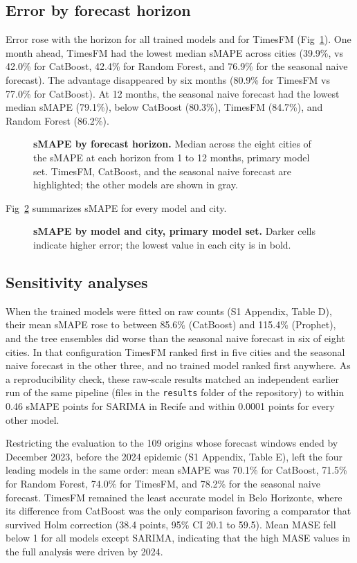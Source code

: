 \documentclass[10pt,letterpaper]{article}
\begin{document}
\subsection*{Error by forecast horizon}
Error rose with the horizon for all trained models and for TimesFM (Fig~\ref{fig3}). One month ahead, TimesFM had the lowest median sMAPE across cities (39.9\%, vs 42.0\% for CatBoost, 42.4\% for Random Forest, and 76.9\% for the seasonal naive forecast). The advantage disappeared by six months (80.9\% for TimesFM vs 77.0\% for CatBoost). At 12 months, the seasonal naive forecast had the lowest median sMAPE (79.1\%), below CatBoost (80.3\%), TimesFM (84.7\%), and Random Forest (86.2\%).

\begin{figure}[!h]
\caption{\textbf{sMAPE by forecast horizon.}
Median across the eight cities of the sMAPE at each horizon from 1 to 12 months, primary model set. TimesFM, CatBoost, and the seasonal naive forecast are highlighted; the other models are shown in gray.}
\label{fig3}
\end{figure}

Fig~\ref{fig4} summarizes sMAPE for every model and city.

\begin{figure}[!h]
\caption{\textbf{sMAPE by model and city, primary model set.}
Darker cells indicate higher error; the lowest value in each city is in bold.}
\label{fig4}
\end{figure}

\subsection*{Sensitivity analyses}
When the trained models were fitted on raw counts (S1 Appendix, Table D), their mean sMAPE rose to between 85.6\% (CatBoost) and 115.4\% (Prophet), and the tree ensembles did worse than the seasonal naive forecast in six of eight cities. In that configuration TimesFM ranked first in five cities and the seasonal naive forecast in the other three, and no trained model ranked first anywhere. As a reproducibility check, these raw-scale results matched an independent earlier run of the same pipeline (files in the \texttt{results} folder of the repository) to within 0.46 sMAPE points for SARIMA in Recife and within 0.0001 points for every other model.

Restricting the evaluation to the 109 origins whose forecast windows ended by December 2023, before the 2024 epidemic (S1 Appendix, Table E), left the four leading models in the same order: mean sMAPE was 70.1\% for CatBoost, 71.5\% for Random Forest, 74.0\% for TimesFM, and 78.2\% for the seasonal naive forecast. TimesFM remained the least accurate model in Belo Horizonte, where its difference from CatBoost was the only comparison favoring a comparator that survived Holm correction (38.4 points, 95\% CI 20.1 to 59.5). Mean MASE fell below 1 for all models except SARIMA, indicating that the high MASE values in the full analysis were driven by 2024.
\end{document}
